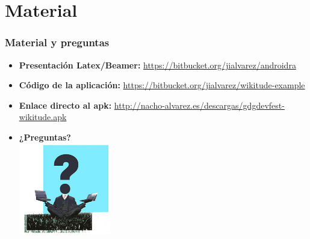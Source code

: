 \section{Material}
\frame
{
\frametitle{Material y preguntas}
\begin{itemize}
 \item \textbf{Presentación Latex/Beamer:} \url{https://bitbucket.org/jialvarez/androidra}
 \item \textbf{Código de la aplicación:} \url{https://bitbucket.org/jialvarez/wikitude-example}
 \item \textbf{Enlace directo al apk:} \url{http://nacho-alvarez.es/descargas/gdgdevfest-wikitude.apk}
 \item \textbf{¿Preguntas?}\\
 \centering\includegraphics[height=4cm]{imgs/preguntas.jpg}
\end{itemize}
}
